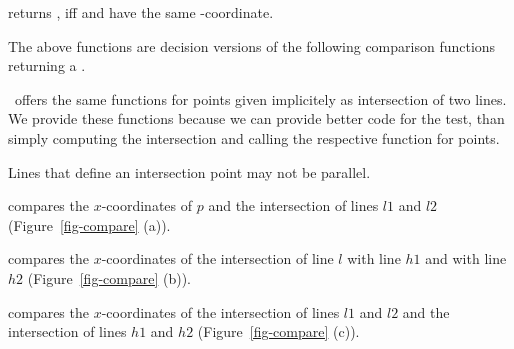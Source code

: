          {returns , iff  and 
	  have the same -coordinate.}


The above functions are decision versions of the following 
comparison functions returning a .

	{}

	{}


\cgal\ offers the same functions for points given implicitely as intersection
of two lines.  We provide these functions because we can provide
better code for the test, than simply computing the intersection and
calling the respective function for points.

\precond Lines that define an intersection point may not be parallel.




	{compares the $x$-coordinates of $p$ and the intersection 
         of lines $l1$ and $l2$ (Figure~\ref{fig-compare} (a)).}


	{compares the $x$-coordinates of  the intersection of line $l$
         with line $h1$ and with line $h2$ (Figure~\ref{fig-compare} (b)).}


	{compares the $x$-coordinates of the intersection of lines $l1$
         and $l2$ and  the intersection of lines $h1$ and $h2$
	 (Figure~\ref{fig-compare} (c)).}
	

